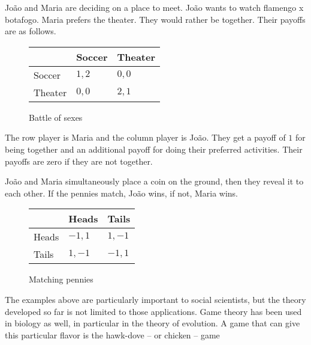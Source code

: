 \documentclass[../../main.tex]{subfiles}
\begin{document}
    \begin{myex}
    \label{BoS}
        João and Maria are deciding on a place to meet. João wants to watch flamengo x botafogo. Maria prefers the theater. They would rather be together. Their payoffs are as follows.
        \begin{figure}[htb]
            \centering
            \begin{tabular}{l|l|l}
                   & Soccer & Theater  \\ \hline
            Soccer & $1,2$  & $0,0$ \\ \hline
            Theater   & $0,0$  & $2,1$
            \end{tabular}
            \caption{Battle of sexes}
            \label{fig:BoS}
        \end{figure}
        The row player is Maria and the column player is João. They get a payoff of $1$ for being together and an additional payoff for doing their preferred activities. Their payoffs are zero if they are not together.
    \end{myex}
    \begin{myex}
    \label{MP}
        João and Maria simultaneously place a coin on the ground, then they reveal it to each other. If the pennies match, João wins, if not, Maria wins. 
        \begin{figure}[htb]
        \centering
        \begin{tabular}{l|l|l}
              & Heads  & Tails  \\ \hline
        Heads & $-1,1$ & $1,-1$ \\ \hline
        Tails & $1,-1$ & $-1,1$
        \end{tabular}
        \caption{Matching pennies}
        \label{fig:MP}
        \end{figure}
    \end{myex}

    The examples above are particularly important to social scientists, but the theory developed so far is not limited to those applications. Game theory has been used in biology as well, in particular in the theory of evolution. A game that can give this particular flavor is the hawk-dove -- or chicken -- game
\end{document}
